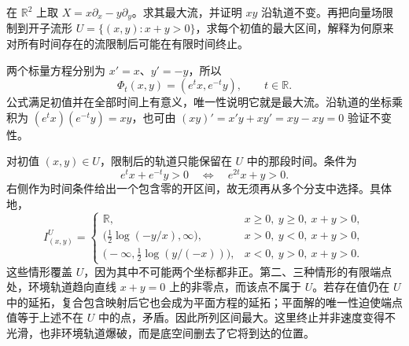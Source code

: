\begin{exercise}\label{g1:ex:saddle-flow-open-restriction}
	在 \(\mathbb R^2\) 上取 \(X=x\partial_x-y\partial_y\)。求其最大流，并证明 \(xy\) 沿轨道不变。再把向量场限制到开子流形 \(U=\{(x,y):x+y>0\}\)，求每个初值的最大区间，解释为何原来对所有时间存在的流限制后可能在有限时间终止。
\end{exercise}
\begin{solution}
	两个标量方程分别为 \(x'=x\)、\(y'=-y\)，所以
	\[
		\Phi_t(x,y)=(e^t x,e^{-t}y),\qquad t\in\mathbb R.
	\]
	公式满足初值并在全部时间上有意义，唯一性说明它就是最大流。沿轨道的坐标乘积为 \((e^t x)(e^{-t}y)=xy\)，也可由 \((xy)'=x'y+xy'=xy-xy=0\) 验证不变性。

	对初值 \((x,y)\in U\)，限制后的轨道只能保留在 \(U\) 中的那段时间。条件为
	\[
		e^t x+e^{-t}y>0\quad\Longleftrightarrow\quad e^{2t}x+y>0.
	\]
	右侧作为时间条件给出一个包含零的开区间，故无须再从多个分支中选择。具体地，
	\[
		I_{(x,y)}^U=
		\begin{cases}
			\mathbb R,&x\geq0,\ y\geq0,\ x+y>0,\\
			\bigl(\tfrac12\log(-y/x),\infty\bigr),&x>0,\ y<0,\ x+y>0,\\
			\bigl(-\infty,\tfrac12\log(y/(-x))\bigr),&x<0,\ y>0,\ x+y>0.
		\end{cases}
	\]
	这些情形覆盖 \(U\)，因为其中不可能两个坐标都非正。第二、三种情形的有限端点处，环境轨道趋向直线 \(x+y=0\) 上的非零点，而该点不属于 \(U\)。若存在值仍在 \(U\) 中的延拓，复合包含映射后它也会成为平面方程的延拓；平面解的唯一性迫使端点值等于上述不在 \(U\) 中的点，矛盾。因此所列区间最大。这里终止并非速度变得不光滑，也非环境轨道爆破，而是底空间删去了它将到达的位置。
\end{solution}

